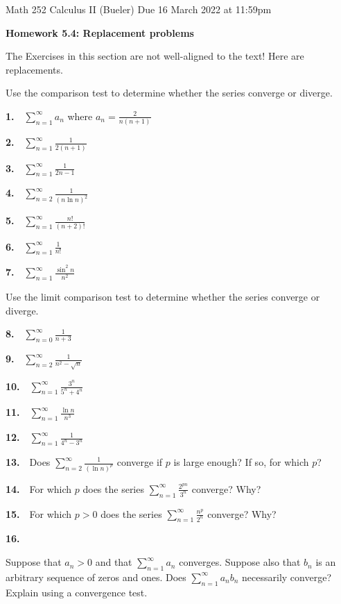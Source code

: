\documentclass[12pt]{amsart}
\newcommand{\ds}{\displaystyle}
\begin{document}
\scriptsize \noindent Math 252 Calculus II (Bueler) \hfill Due 16 March 2022 at 11:59pm
\normalsize

\Large
\bigskip
\centerline{\textbf{Homework 5.4: Replacement problems}}
\medskip
\normalsize

\thispagestyle{empty}

\bigskip

The Exercises in this section are not well-aligned to the text!  Here are replacements.

\bigskip
\noindent Use the comparison test to determine whether the series converge or diverge.

\newcommand{\pr}[1]{\bigskip \textbf{#1.} \,\,}

\pr{1} $\ds \sum_{n=1}^\infty a_n$ where $\ds a_n = \frac{2}{n(n+1)}$

\pr{2} $\ds \sum_{n=1}^\infty \frac{1}{2(n+1)}$

\pr{3} $\ds \sum_{n=1}^\infty \frac{1}{2n - 1}$

\pr{4} $\ds \sum_{n=2}^\infty \frac{1}{(n\ln n)^2}$

\pr{5} $\ds \sum_{n=1}^\infty \frac{n!}{(n+2)!}$

\pr{6} $\ds \sum_{n=1}^\infty \frac{1}{n!}$

\pr{7} $\ds \sum_{n=1}^\infty \frac{\sin^2 n}{n^2}$

\bigskip
\noindent Use the limit comparison test to determine whether the series converge or diverge.

\pr{8} $\ds \sum_{n=0}^\infty \frac{1}{n+3}$

\pr{9} $\ds \sum_{n=2}^\infty \frac{1}{n^2 - \sqrt{n}}$

\pr{10} $\ds \sum_{n=1}^\infty \frac{3^n}{5^n + 4^n}$

\pr{11} $\ds \sum_{n=1}^\infty \frac{\ln n}{n^3}$

\pr{12} $\ds \sum_{n=1}^\infty \frac{1}{4^n - 3^n}$

\bigskip
\pr{13} Does $\ds \sum_{n=2}^\infty \frac{1}{(\ln n)^p}$ converge if $p$ is large enough?  If so, for which $p$?

\pr{14} For which $p$ does the series $\sum_{n=1}^\infty \frac{2^{pn}}{3^n}$ converge?  Why?

\pr{15} For which $p>0$ does the series $\sum_{n=1}^\infty \frac{n^p}{2^n}$ converge?  Why?

\pr{16} \begin{minipage}[t]{5.5in} Suppose that $a_n>0$ and that $\ds \sum_{n=1}^\infty a_n$ converges.  Suppose also that $b_n$ is an arbitrary sequence of zeros and ones. Does $\ds \sum_{n=1}^\infty a_n b_n$ necessarily converge?  Explain using a convergence test. \end{minipage}
\end{document}
